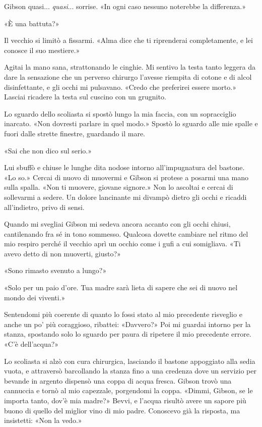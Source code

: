 Gibson quasi... \emph{quasi}... sorrise. «In ogni caso nessuno noterebbe
la differenza.»

«È una battuta?»

Il vecchio si limitò a fissarmi. «Alma dice che ti riprenderai
completamente, e lei conosce il suo mestiere.»

Agitai la mano sana, strattonando le cinghie. Mi sentivo la testa tanto
leggera da dare la sensazione che un perverso chirurgo l'avesse riempita
di cotone e di alcol disinfettante, e gli occhi mi pulsavano. «Credo che
preferirei essere morto.» Lasciai ricadere la testa sul cuscino con un
grugnito.

Lo sguardo dello scoliasta si spostò lungo la mia faccia, con un
sopracciglio inarcato. «Non dovresti parlare in quel modo.» Spostò lo
sguardo alle mie spalle e fuori dalle strette finestre, guardando il
mare.

«Sai che non dico sul serio.»

Lui sbuffò e chiuse le lunghe dita nodose intorno all'impugnatura del
bastone. «Lo so.» Cercai di nuovo di muovermi e Gibson si protese a
posarmi una mano sulla spalla. «Non ti muovere, giovane signore.» Non lo
ascoltai e cercai di sollevarmi a sedere. Un dolore lancinante mi
divampò dietro gli occhi e ricaddi all'indietro, privo di sensi.

Quando mi svegliai Gibson mi sedeva ancora accanto con gli occhi chiusi,
cantilenando fra sé in tono sommesso. Qualcosa dovette cambiare nel
ritmo del mio respiro perché il vecchio aprì un occhio come i gufi a cui
somigliava. «Ti avevo detto di non muoverti, giusto?»

«Sono rimasto svenuto a lungo?»

«Solo per un paio d'ore. Tua madre sarà lieta di sapere che sei di nuovo
nel mondo dei viventi.»

Sentendomi più coerente di quanto lo fossi stato al mio precedente
risveglio e anche un po' più coraggioso, ribattei: «Davvero?» Poi mi
guardai intorno per la stanza, spostando solo lo sguardo per paura di
ripetere il mio precedente errore. «C'è dell'acqua?»

Lo scoliasta si alzò con cura chirurgica, lasciando il bastone
appoggiato alla sedia vuota, e attraversò barcollando la stanza fino a
una credenza dove un servizio per bevande in argento dispensò una coppa
di acqua fresca. Gibson trovò una cannuccia e tornò al mio capezzale,
porgendomi la coppa. «Dimmi, Gibson, se le importa tanto, dov'è mia
madre?» Bevvi, e l'acqua risultò avere un sapore più buono di quello del
miglior vino di mio padre. Conoscevo già la risposta, ma insistetti:
«Non la vedo.»

